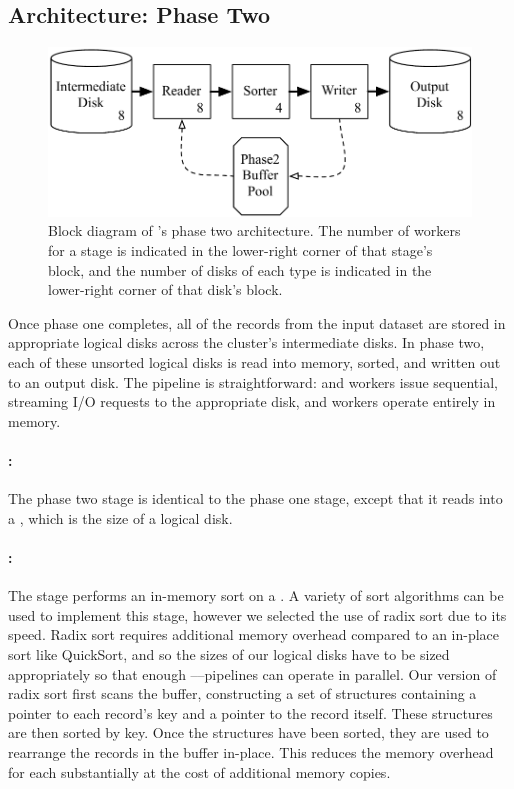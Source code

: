 \subsection{\tritonsort Architecture: Phase Two}

\begin{figure}
  \centering
  \includegraphics[width=\columnwidth]{tritonsort/figs/phase2.pdf}

  \caption{Block diagram of \tritonsort's phase two architecture.  The
    number of workers for a stage is indicated in the lower-right corner of
    that stage's block, and the number of disks of each type is indicated in
    the lower-right corner of that disk's block.}
  \label{fig:phase2}
\end{figure}

Once phase one completes, all of the records from the input dataset are stored
in appropriate logical disks across the cluster's intermediate disks.  In phase
two, each of these unsorted logical disks is read into memory, sorted, and
written out to an output disk.  The pipeline is straightforward: \reader and
\writer workers issue sequential, streaming I/O requests to the appropriate
disk, and \sorter workers operate entirely in memory.

\paragraph{\reader:}  The phase two \reader stage is identical to
the phase one \reader stage, except that it reads into a \phasetwobuffer, which
is the size of a logical disk.

\paragraph{\sorter:}  The \sorter stage performs an in-memory sort on a
\phasetwobuffer.  A variety of sort algorithms can be used to implement this
stage, however we selected the use of radix sort due to its speed.  Radix sort
requires additional memory overhead compared to an in-place sort like
QuickSort, and so the sizes of our logical disks have to be sized appropriately
so that enough \reader--\sorter--\writer pipelines can operate in parallel.
Our version of radix sort first scans the buffer, constructing a set of
structures containing a pointer to each record's key and a pointer to the record
itself.  These structures are then sorted by key.  Once the structures have
been sorted, they are used to rearrange the records in the buffer in-place. This
reduces the memory overhead for each \sorter substantially at the cost of
additional memory copies.


